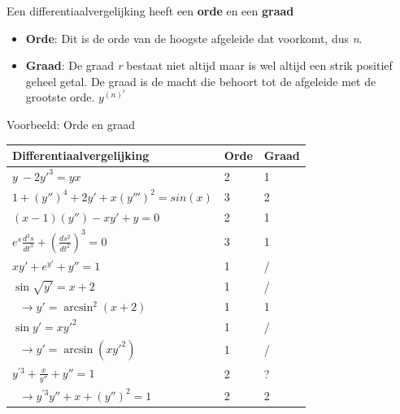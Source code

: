 \documentclass[12pt]{report}
\newcommand{\example}[2]{
    \hrulefill
    
    Voorbeeld: #1
    
    #2
    
    \hrulefill
}
\begin{document}
Een differentiaalvergelijking heeft een \textbf{orde} en een \textbf{graad}
\begin{itemize}
    \item \textbf{Orde}: Dit is de orde van de hoogste afgeleide dat voorkomt, dus \textit{n}.
    \item \textbf{Graad}: De graad \textit{r} bestaat niet altijd maar is wel altijd een strik positief geheel getal. De graad is de macht die behoort tot de afgeleide met de grootste orde. $y^{(n)^{r}}$
\end{itemize}
\example{Orde en graad}{
    \begin{center}
        \begin{tabular}{l | l | l}
            Differentiaalvergelijking                          & Orde & Graad \\
            \hline
            $y\ - 2y'^3 = yx$                                  & 2    & 1     \\
            $1 + (y'')^4 + 2y' + x(y''')^2 = sin(x)$           & 3    & 2     \\
            $(x - 1)(y'') - xy' + y = 0$                       & 2    & 1     \\
            $e^s\frac{d^3s}{dt^3} + (\frac{ds^2}{dt^2})^3 = 0$ & 3    & 1     \\
            $xy' + e^{y'} + y'' = 1$                           & 1    & /     \\
            \hline
            $\sin\sqrt {y'} = x + 2$                           & 1    & /     \\
            $\;\;\rightarrow y' = \arcsin^2(x+2)$              & 1    & 1     \\
            \hline
            $\sin y' = xy'^2$                                  & 1    & /     \\
            $\;\;\rightarrow y' = \arcsin(xy'^2)$              & 1    & /     \\
            \hline
            $y^{'3} + \frac{x}{y''} + y'' = 1$                 & 2    & ?     \\
            $\;\;\rightarrow y^{'3}y'' + x + (y'')^2 = 1$      & 2    & 2     
            
        \end{tabular}
    \end{center}
}
\end{document}
